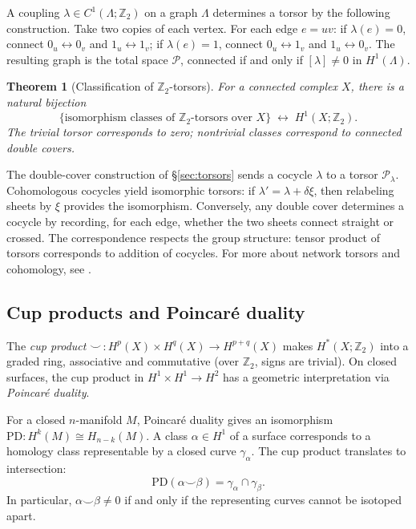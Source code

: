 \documentclass[11pt]{amsart}  %
\theoremstyle{plain}
\newtheorem{theorem}{Theorem}[section]
\theoremstyle{definition}
\theoremstyle{remark}
\newcommand{\style}[1]{{\em #1}} %
\newcommand{\torsor}{\mathcal{P}} %
\newcommand{\coboundary}{\delta} %
\newcommand{\Z}{\mathbb{Z}} %
\newcommand{\cgraph}{\Lambda} %
\newcommand{\coupling}{\lambda} %
\newcommand{\cupprod}{\smile} %
\begin{document}
A coupling $\coupling \in C^1(\cgraph; \Z_2)$ on a graph $\cgraph$ 
determines a torsor by the following construction. Take two copies of each 
vertex. For each edge $e = uv$: if $\coupling(e) = 0$, connect 
$0_u \leftrightarrow 0_v$ and $1_u \leftrightarrow 1_v$; if $\coupling(e) = 1$, 
connect $0_u \leftrightarrow 1_v$ and $1_u \leftrightarrow 0_v$. The 
resulting graph is the total space $\torsor$, connected if and only if 
$[\coupling] \neq 0$ in $H^1(\cgraph)$.

\begin{theorem}[Classification of $\Z_2$-torsors]
\label{thm:torsor-classification}
For a connected complex $X$, there is a natural bijection
\[
\{ \text{isomorphism classes of $\Z_2$-torsors over } X \} 
\;\longleftrightarrow\; H^1(X; \Z_2).
\]
The trivial torsor corresponds to zero; nontrivial classes correspond to 
connected double covers.
\end{theorem}

The double-cover construction of \S\ref{sec:torsors} sends a cocycle 
$\coupling$ to a torsor $\torsor_\coupling$. Cohomologous cocycles yield 
isomorphic torsors: if $\coupling' = \coupling + \coboundary\xi$, then 
relabeling sheets by $\xi$ provides the isomorphism. Conversely, any double 
cover determines a cocycle by recording, for each edge, whether the two 
sheets connect straight or crossed. The correspondence respects the group 
structure: tensor product of torsors corresponds to addition of cocycles.
For more about network torsors and cohomology, see \cite{GhristCooperband2025Obstructions}.

\subsection{Cup products and Poincar\'e duality}

The \style{cup product} $\cupprod \,\colon H^p(X) \times H^q(X) \to H^{p+q}(X)$ 
makes $H^*(X; \Z_2)$ into a graded ring, associative and commutative 
(over $\Z_2$, signs are trivial). On closed surfaces, the cup product in 
$H^1 \times H^1 \to H^2$ has a geometric interpretation via 
\style{Poincar\'e duality}.

For a closed $n$-manifold $M$, Poincar\'e duality gives an isomorphism 
$\mathrm{PD}: H^k(M) \cong H_{n-k}(M)$. A class $\alpha \in H^1$ of a 
surface corresponds to a homology class representable by a closed curve 
$\gamma_\alpha$. The cup product translates to intersection:
\[
\mathrm{PD}(\alpha \cupprod \beta) = \gamma_\alpha \cap \gamma_\beta.
\]
In particular, $\alpha \cupprod \beta \neq 0$ if and only if the 
representing curves cannot be isotoped apart.
\end{document}
